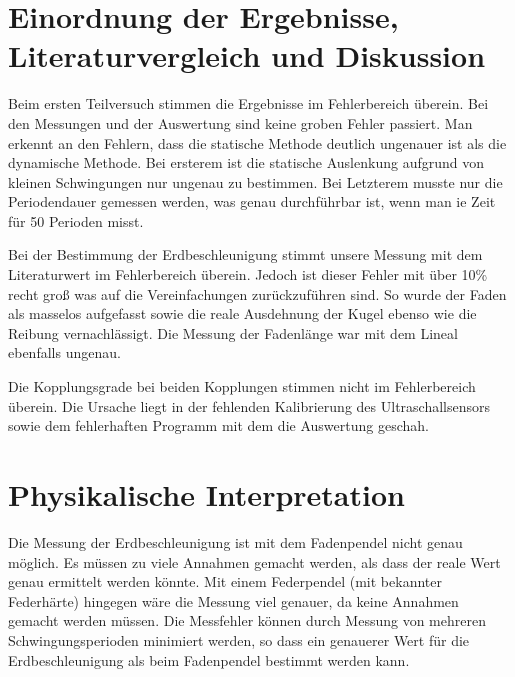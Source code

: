 \clearpage

\section{Einordnung der Ergebnisse, Literaturvergleich und Diskussion}

Beim ersten Teilversuch stimmen die Ergebnisse im Fehlerbereich überein. Bei den Messungen und der Auswertung sind keine groben Fehler passiert. Man erkennt an den Fehlern, dass die statische Methode deutlich ungenauer ist als die dynamische Methode. Bei ersterem ist die statische Auslenkung aufgrund von kleinen Schwingungen nur ungenau zu bestimmen. Bei Letzterem musste nur die Periodendauer gemessen werden, was genau durchführbar ist, wenn man ie Zeit für 50 Perioden misst.

Bei der Bestimmung der Erdbeschleunigung stimmt unsere Messung mit dem Literaturwert im Fehlerbereich überein. Jedoch ist dieser Fehler mit über 10\% recht groß was auf die Vereinfachungen zurückzuführen sind. So wurde der Faden als masselos aufgefasst sowie die reale Ausdehnung der Kugel ebenso wie die Reibung vernachlässigt. Die Messung der Fadenlänge war mit dem Lineal ebenfalls ungenau.

Die Kopplungsgrade bei beiden Kopplungen stimmen nicht im Fehlerbereich überein. Die Ursache liegt in der fehlenden Kalibrierung des Ultraschallsensors sowie dem fehlerhaften Programm mit dem die Auswertung geschah. %

\section{Physikalische Interpretation}

Die Messung der Erdbeschleunigung ist mit dem Fadenpendel nicht genau möglich. Es müssen zu viele Annahmen gemacht werden, als dass der reale Wert genau ermittelt werden könnte. Mit einem Federpendel (mit bekannter Federhärte) hingegen wäre die Messung viel genauer, da keine Annahmen gemacht werden müssen. Die Messfehler können durch Messung von mehreren Schwingungsperioden minimiert werden, so dass ein genauerer Wert für die Erdbeschleunigung als beim Fadenpendel bestimmt werden kann.
